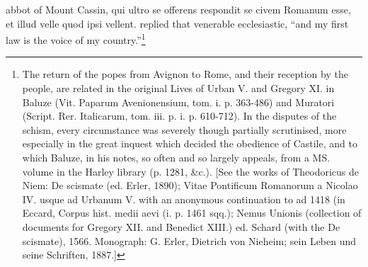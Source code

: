 {abbot of Mount Cassin, qui ultro se offerens respondit se civem Romanum esse, et illud velle quod ipsi vellent.} replied that venerable ecclesiastic, \texthebrew{“}and my first law is the voice of my country.\texthebrew{}”\footnote{The return of the popes from Avignon to Rome, and their reception by the people, are related in the original Lives of Urban V. and Gregory XI. in Baluze (Vit. Paparum Avenionensium, tom. i. p. 363-486) and Muratori (Script. Rer. Italicarum, tom. iii. p. i. p. 610-712). In the disputes of the schism, every circumstance was severely though partially scrutinised, more especially in the great inquest which decided the obedience of Castile, and to which Baluze, in his notes, so often and so largely appeals, from a MS. volume in the Harley library (p. 1281, \&c.). [See the works of Theodoricus de Niem: De scismate (ed. Erler, 1890); Vitae Pontificum Romanorum a Nicolao IV. usque ad Urbanum V. with an anonymous continuation to ad 1418 (in Eccard, Corpus hist. medii aevi (i. p. 1461 sqq.); Nemus Unionis (collection of documents for Gregory XII. and Benedict XIII.) ed. Schard (with the De scismate), 1566. Monograph: G. Erler, Dietrich von Nieheim; sein Leben und seine Schriften, 1887.]}

